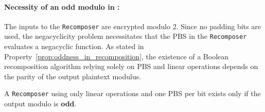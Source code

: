 \paragraph{Necessity of an odd modulo in \SubBytes:} 
The inputs to the \texttt{Recomposer} are encrypted modulo 2. Since no padding bits are used, the negacyclicity problem necessitates that the \gls{PBS} in the \texttt{Recomposer} evaluates a negacyclic function. As stated in Property~\ref{prop:oddness_in_recomposition}, the existence of a Boolean recomposition algorithm relying solely on \gls{PBS} and linear operations depends on the parity of the output plaintext modulus.

\begin{property}
    A \texttt{Recomposer} using only linear operations and one \gls{PBS} per bit exists only if the output modulo is \textbf{odd}.
    \label{prop:oddness_in_recomposition}
\end{property}


